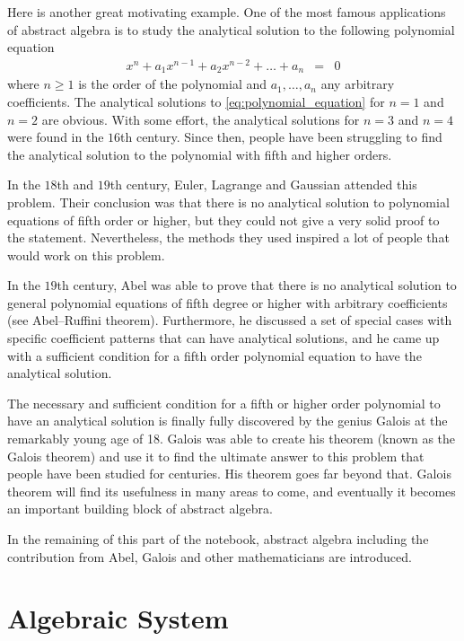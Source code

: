 Here is another great motivating example. One of the most famous applications of abstract algebra is to study the analytical solution to the following polynomial equation
\begin{eqnarray}
  x^n + a_1x^{n-1} + a_2x^{n-2} + \ldots + a_n &=& 0 \label{eq:polynomial_equation}
\end{eqnarray}
where $n\geq 1$ is the order of the polynomial and $a_1, \ldots, a_n$ any arbitrary coefficients. The analytical solutions to \eqref{eq:polynomial_equation} for $n=1$ and $n=2$ are obvious. With some effort, the analytical solutions for $n=3$ and $n=4$ were found in the $16$th century. Since then, people have been struggling to find the analytical solution to the polynomial with fifth and higher orders.

In the $18$th and $19$th century, Euler, Lagrange and Gaussian attended this problem. Their conclusion was that there is no analytical solution to polynomial equations of fifth order or higher, but they could not give a very solid proof to the statement. Nevertheless, the methods they used inspired a lot of people that would work on this problem.

In the $19$th century, Abel was able to prove that there is no analytical solution to general polynomial equations of fifth degree or higher with arbitrary coefficients (see Abel–Ruffini theorem). Furthermore, he discussed a set of special cases with specific coefficient patterns that can have analytical solutions, and he came up with a sufficient condition for a fifth order polynomial equation to have the analytical solution. 

The necessary and sufficient condition for a fifth or higher order polynomial to have an analytical solution is finally fully discovered by the genius Galois at the remarkably young age of 18. Galois was able to create his theorem (known as the Galois theorem) and use it to find the ultimate answer to this problem that people have been studied for centuries. His theorem goes far beyond that. Galois theorem will find its usefulness in many areas to come, and eventually it becomes an important building block of abstract algebra. 

In the remaining of this part of the notebook, abstract algebra including the contribution from Abel, Galois and other mathematicians are introduced.

\section{Algebraic System}

